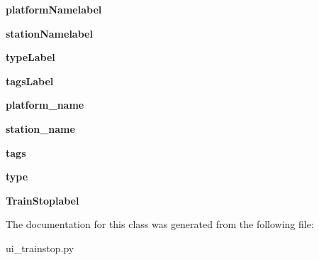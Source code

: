 \begin{DoxyCompactItemize}
\item 
\hypertarget{class_sim_g_d_c_1_1ui__trainstop_1_1_ui___train_stop_a94ee9874b9c61dd25952e35385ed21eb}{}{\bfseries platform\+Namelabel}\label{class_sim_g_d_c_1_1ui__trainstop_1_1_ui___train_stop_a94ee9874b9c61dd25952e35385ed21eb}

\item 
\hypertarget{class_sim_g_d_c_1_1ui__trainstop_1_1_ui___train_stop_a00d99dc5b18ade6a07476b336dd49283}{}{\bfseries station\+Namelabel}\label{class_sim_g_d_c_1_1ui__trainstop_1_1_ui___train_stop_a00d99dc5b18ade6a07476b336dd49283}

\item 
\hypertarget{class_sim_g_d_c_1_1ui__trainstop_1_1_ui___train_stop_ae1c64e4bb2e86ccec6a4b947697ba591}{}{\bfseries type\+Label}\label{class_sim_g_d_c_1_1ui__trainstop_1_1_ui___train_stop_ae1c64e4bb2e86ccec6a4b947697ba591}

\item 
\hypertarget{class_sim_g_d_c_1_1ui__trainstop_1_1_ui___train_stop_aa1984fb9ec93bb7af1f1eda7d670f058}{}{\bfseries tags\+Label}\label{class_sim_g_d_c_1_1ui__trainstop_1_1_ui___train_stop_aa1984fb9ec93bb7af1f1eda7d670f058}

\item 
\hypertarget{class_sim_g_d_c_1_1ui__trainstop_1_1_ui___train_stop_a4ecc8e4db9a592125654c907564b3477}{}{\bfseries platform\+\_\+name}\label{class_sim_g_d_c_1_1ui__trainstop_1_1_ui___train_stop_a4ecc8e4db9a592125654c907564b3477}

\item 
\hypertarget{class_sim_g_d_c_1_1ui__trainstop_1_1_ui___train_stop_a4461c270fd74c31796787e8ff90d9b1e}{}{\bfseries station\+\_\+name}\label{class_sim_g_d_c_1_1ui__trainstop_1_1_ui___train_stop_a4461c270fd74c31796787e8ff90d9b1e}

\item 
\hypertarget{class_sim_g_d_c_1_1ui__trainstop_1_1_ui___train_stop_a75cc6c24c050cf7d4f084890c5524207}{}{\bfseries tags}\label{class_sim_g_d_c_1_1ui__trainstop_1_1_ui___train_stop_a75cc6c24c050cf7d4f084890c5524207}

\item 
\hypertarget{class_sim_g_d_c_1_1ui__trainstop_1_1_ui___train_stop_aec2abdf0672fba06bf8d337c00aa3b78}{}{\bfseries type}\label{class_sim_g_d_c_1_1ui__trainstop_1_1_ui___train_stop_aec2abdf0672fba06bf8d337c00aa3b78}

\item 
\hypertarget{class_sim_g_d_c_1_1ui__trainstop_1_1_ui___train_stop_aac5af35f77d84bd14ced09a9dcc44327}{}{\bfseries Train\+Stoplabel}\label{class_sim_g_d_c_1_1ui__trainstop_1_1_ui___train_stop_aac5af35f77d84bd14ced09a9dcc44327}

\end{DoxyCompactItemize}


The documentation for this class was generated from the following file\+:\begin{DoxyCompactItemize}
\item 
ui\+\_\+trainstop.\+py\end{DoxyCompactItemize}
